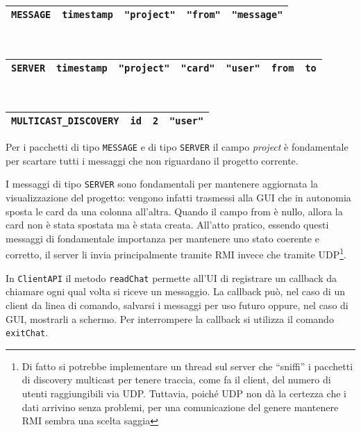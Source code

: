 \documentclass[a4paper,11pt] {article}
\begin{document}
\begin{table}[H]
	\begin{tabular}{|l|l|l|l|l|}
		\hline
		\texttt{MESSAGE} & \texttt{timestamp} & \texttt{"project"} & \texttt{"from"} & \texttt{"message"} \\ \hline
	\end{tabular}
	~\\
	\begin{tabular}{|l|l|l|l|l|l|l|}
		\hline
		\texttt{SERVER} & \texttt{timestamp} & \texttt{"project"} & \texttt{"card"} & \texttt{"user"} & \texttt{from} & \texttt{to} \\ \hline
	\end{tabular}
	~\\
	\begin{tabular}{|l|l|l|l|}
		\hline
		\texttt{MULTICAST_DISCOVERY} & \texttt{id} & \texttt{2} & \texttt{"user"} \\ \hline
	\end{tabular}
\end{table}

Per i pacchetti di tipo \texttt{MESSAGE} e di tipo \texttt{SERVER} il campo \textit{project} è fondamentale per scartare tutti i messaggi che non riguardano il progetto corrente.

I messaggi di tipo \texttt{SERVER} sono fondamentali per mantenere aggiornata la visualizzazione del progetto: vengono infatti trasmessi alla GUI che in autonomia sposta le card da una colonna all'altra. Quando il campo from è nullo, allora la card non è stata spostata ma è stata creata. All'atto pratico, essendo questi messaggi di fondamentale importanza per mantenere uno stato coerente e corretto, il server li invia principalmente tramite RMI invece che tramite UDP\footnote{Di fatto si potrebbe implementare un thread sul server che ``sniffi'' i pacchetti di discovery multicast per tenere traccia, come fa il client, del numero di utenti raggiungibili via UDP. Tuttavia, poiché UDP non dà la certezza che i dati arrivino senza problemi, per una comunicazione del genere mantenere RMI sembra una scelta saggia}.

In \texttt{ClientAPI} il metodo \texttt{readChat} permette all'UI di registrare un callback da chiamare ogni qual volta si riceve un messaggio. La callback può, nel caso di un client da linea di comando, salvarsi i messaggi per uso futuro oppure, nel caso di GUI, mostrarli a schermo. Per interrompere la callback si utilizza il comando \texttt{exitChat}.
\end{document}
